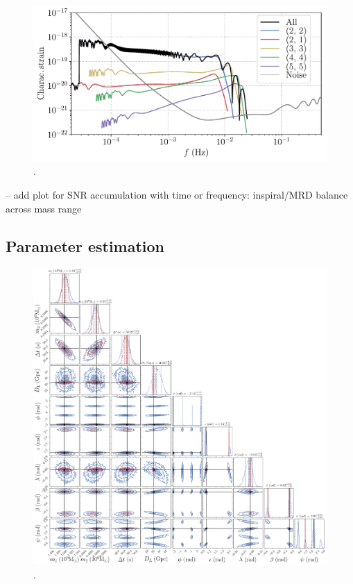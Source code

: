 \documentclass[aps,showpacs,twocolumn,prd,superscriptaddress,nofootinbib]{revtex4-1}
\begin{document}
\begin{figure}
  \centering
  \includegraphics[width=.99\linewidth]{../plots/plot_hc_tdia_hm.pdf}
  \caption{.}
  \label{fig:FDHMSMBHCase9}
\end{figure}

-- add plot for SNR accumulation with time or frequency: inspiral/MRD balance across mass range


\subsection{Parameter estimation}
\label{sec:SMBHPE}

\begin{figure}
  \centering
  \includegraphics[width=.98\linewidth]{../plots/corner_smbh_case0_ptmcmc_22_hm.png}
  \caption{.}
  \label{fig:PEsmbh22hmCase0}
\end{figure}
\end{document}
